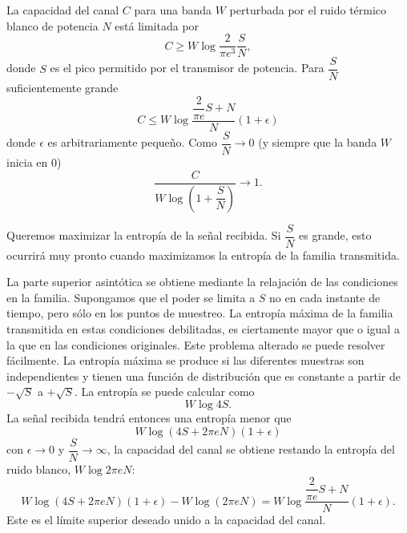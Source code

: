 \begin{theorem}
\label{th:20}
  La capacidad del canal $C$ para una banda $W$ perturbada por el
  ruido t\'ermico blanco de potencia $N$ est\'a limitada por
  \begin{equation}
    C \ge W \log \dfrac{2}{\pi e^3} \dfrac{S}{N},
  \end{equation}
  donde $S$ es el pico permitido por el transmisor de potencia. Para
  $\dfrac{S}{N}$ suficientemente grande
  \begin{equation}
    C \le W \log \dfrac{\dfrac{2}{\pi e} S + N}{N} (1 + \epsilon)
  \end{equation}
  donde $\epsilon$ es arbitrariamente peque\~no. Como
  $\dfrac{S}{N} \to 0$ (y siempre que la banda $W$ inicia en 0)
  \begin{equation}
    \frac{C}{W \log \left(1 + \dfrac{S}{N} \right)} \to 1.
  \end{equation}
\end{theorem}

Queremos maximizar la entrop\'ia de la se\~nal recibida. Si
$\dfrac{S}{N}$ es grande, esto ocurrir\'a muy pronto cuando
maximizamos la entrop\'ia de la familia transmitida.

La parte superior asint\'otica se obtiene mediante la relajaci\'on de
las condiciones en la familia. Supongamos que el poder se limita a
$S$ no en cada instante de tiempo, pero s\'olo en los puntos de
muestreo. La entrop\'ia m\'axima de la familia transmitida en estas
condiciones debilitadas, es ciertamente mayor que o igual a la que en
las condiciones originales. Este problema alterado se puede resolver
f\'acilmente. La entrop\'ia m\'axima se produce si las diferentes
muestras son independientes y tienen una funci\'on de distribuci\'on
que es constante a partir de $-\sqrt{S}$ a $+\sqrt{S}$. La entrop\'ia
se puede calcular como
\begin{equation}
  W \log 4S.
\end{equation}
La se\~nal recibida tendr\'a entonces una entrop\'ia menor que
\begin{equation}
  W \log (4S + 2 \pi eN)(1 + \epsilon)
\end{equation}
con $\epsilon \to 0$ y $\dfrac{S}{N} \to \infty$, la capacidad del
canal se obtiene restando la entrop\'ia del ruido blanco,
$W \log 2 \pi eN$:
\begin{equation}
  W \log (4S + 2 \pi eN)(1 + \epsilon) - W \log (2 \pi eN) =
  W \log \dfrac{\dfrac{2}{\pi e} S + N}{N} (1 + \epsilon).
\end{equation}
Este es el l\'imite superior deseado unido a la capacidad del canal.

